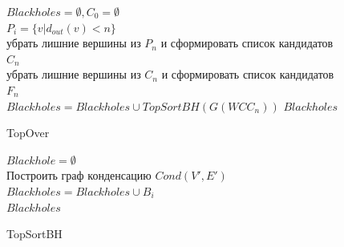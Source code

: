 \documentclass[12pt,a4paper,oneside]{article}
\theoremstyle{definition}
\theoremstyle{lemma}
\theoremstyle{remark}
\begin{document}
\linespread{1.0}
\begin{figure}[H]
	\begin{center}
		\begin{algorithm}[H]
			\SetAlgoLined

                        $Blackholes = \emptyset, C_0 = \emptyset$ \\
                        $P_i = \{v | d_{out}(v) < n\}$ \\
                        убрать лишние вершины из $P_n$ и сформировать список кандидатов $C_n$ \\
                        убрать лишние вершины из $C_n$ и сформировать список кандидатов $F_n$ \\
                         {
                            $Blackholes = Blackholes \cup TopSortBH(G(WCC_n))$
                        }
                        \Return $Blackholes$
			\label{alg:topover}
			\caption{TopOver}
		\end{algorithm}
	\end{center}
\end{figure}
\linespread{1.5}

\linespread{1.0}
\begin{figure}[H]
	\begin{center}
		\begin{algorithm}[H]
			\SetAlgoLined

                        $Blackhole = \emptyset$\\
                        Построить граф конденсацию $Cond(V',E')$ \\
                         {
                             {
                                 {
                                     {
                                        $Blackholes = Blackholes \cup B_i$ \\
                                    }
                                }
                            }
                        }
                        \Return $Blackholes$
			\label{alg:topsort}
			\caption{TopSortBH}
		\end{algorithm}
	\end{center}
\end{figure}
\linespread{1.5}
\end{document}
